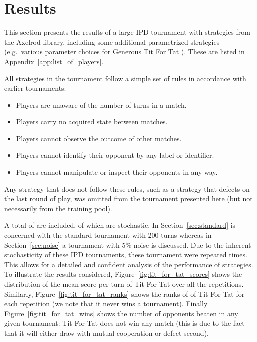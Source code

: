 \documentclass{article}
\begin{document}
\section{Results}\label{sec:results}

This section presents the results of a large IPD tournament with
strategies from the Axelrod library, including some additional parametrized
strategies (e.g.\ various parameter choices for Generous Tit For Tat
\cite{Gaudesi2016}). These are
listed in Appendix~\ref{app:list_of_players}.

All strategies in the tournament follow a simple set of
rules in accordance with earlier tournaments:

\begin{itemize}
  \item Players are unaware of the number of turns in a match.
  \item Players carry no acquired state between matches.
  \item Players cannot observe the outcome of other matches.
  \item Players cannot identify their opponent by any label or identifier.
  \item Players cannot manipulate or inspect their opponents in any way.
\end{itemize}

Any strategy that does not follow these rules, such as a strategy that defects
on the last round of play, was omitted from the tournament presented here (but
not necessarily from the training pool).

A total of are included, of which
are stochastic.  In
Section~\ref{sec:standard} is concerned with the standard tournament with 200
turns whereas in Section~\ref{sec:noise} a tournament with 5\% noise is
discussed. Due to the inherent stochasticity of these IPD tournaments, these
tournament were repeated 
times. This allows for a detailed and confident analysis of the performance of
strategies. To illustrate the results considered,
Figure~\ref{fig:tit_for_tat_scores} shows the distribution of the mean score per
turn of Tit For Tat over all the repetitions. Similarly,
Figure~\ref{fig:tit_for_tat_ranks} shows the ranks of of Tit For Tat for each
repetition (we note that it never wins a tournament). Finally
Figure~\ref{fig:tit_for_tat_wins} shows the number of opponents beaten in any given
tournament: Tit For Tat does not win any match (this is due to the fact that it
will either draw with mutual cooperation or defect second).
\end{document}
